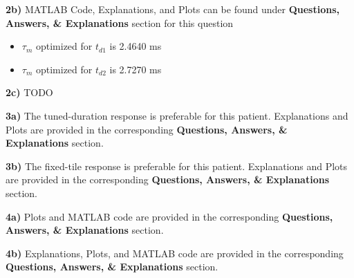 \documentclass[]{report}
\begin{document}
\textbf{2b)}
MATLAB Code, Explanations, and Plots can be found under \textbf{Questions, Answers, \& Explanations} section for this question
\begin{itemize}
	\item $\tau_m$ optimized for $t_{d1}$ is 2.4640 ms
	\item $\tau_m$ optimized for $t_{d2}$ is 2.7270 ms
\end{itemize}

\textbf{2c)}
TODO

\textbf{3a)}
The tuned-duration response is preferable for this patient. Explanations and Plots are provided in the corresponding \textbf{Questions, Answers, \& Explanations} section.

\textbf{3b)}
The fixed-tile response is preferable for this patient. Explanations and Plots are provided in the corresponding \textbf{Questions, Answers, \& Explanations} section.

\textbf{4a)}
Plots and MATLAB code are provided in the corresponding \textbf{Questions, Answers, \& Explanations} section.


\textbf{4b)}
Explanations, Plots, and MATLAB code are provided in the corresponding \textbf{Questions, Answers, \& Explanations} section.
\end{document}
